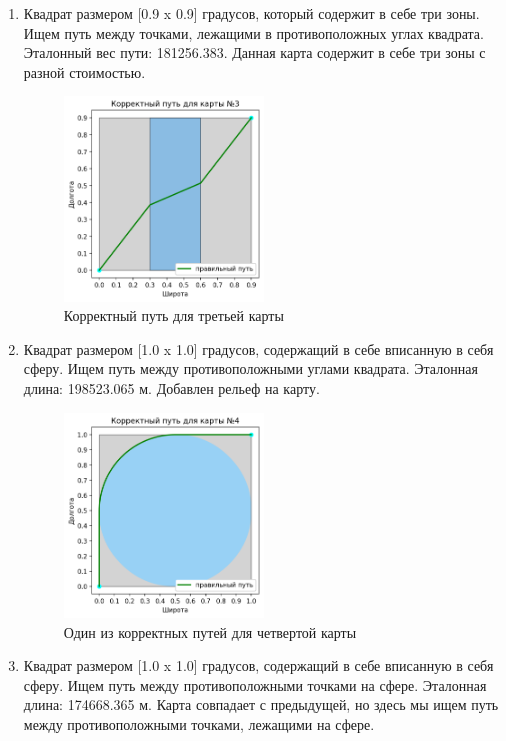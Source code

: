 \begin{enumerate}
{	}
	\item {
		Квадрат размером [0.9 x 0.9] градусов, который содержит в себе три зоны. Ищем путь между точками, лежащими в противоположных углах квадрата. Эталонный вес пути: 181256.383. Данная карта содержит в себе три зоны с разной стоимостью.
		\begin{figure}[H]
			\includegraphics[width=0.5\textwidth]{images/3_3.png}
			\caption{Корректный путь для третьей карты}
			\label{pic:correct_third}
		\end{figure}
	\vspace{2mm}
	}
	\item { 
		Квадрат размером [1.0 x 1.0] градусов, содержащий в себе вписанную в себя сферу. Ищем путь между противоположными углами квадрата. Эталонная длина: 198523.065 м. Добавлен рельеф на карту.
		\begin{figure}[H]
			\includegraphics[width=0.5\textwidth]{images/3_4.png}
			\caption{Один из корректных путей для четвертой карты}
			\label{pic:correct_fourth}
		\end{figure}
	\vspace{2mm}
		}
	\item {
		Квадрат размером [1.0 x 1.0] градусов, содержащий в себе вписанную в себя сферу. Ищем путь между противоположными точками на сфере. Эталонная длина: 174668.365 м. Карта совпадает с предыдущей, но здесь мы ищем путь между противоположными точками, лежащими на сфере.
}
\end{enumerate}
